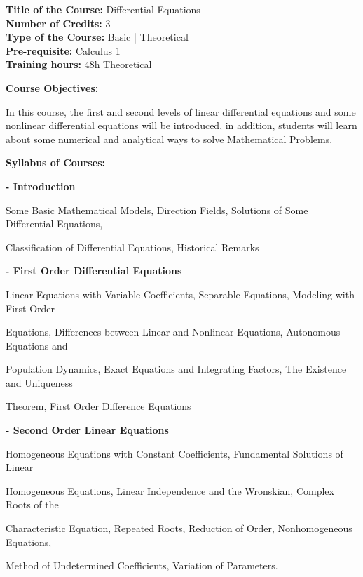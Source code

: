 \documentclass[12pt,a4paper]{article}
\begin{document}
\newpage
\textbf{Title of the Course:} Differential Equations\\
\textbf{Number of Credits:} 3\\
\textbf{Type of the Course:} Basic | Theoretical\\
\textbf{Pre-requisite:} Calculus 1\\
\textbf{Training hours:} 48h Theoretical\par\vspace{4pt}
\textbf{Course Objectives:}\par\vspace{2pt}
In this course, the first and second levels of linear differential equations and some nonlinear
differential equations will be introduced, in addition, students will learn about some numerical and
analytical ways to solve Mathematical Problems.\par\vspace{4pt}
\textbf{Syllabus of Courses:}\par\vspace{2pt}
\vspace{2pt}\textbf{- Introduction}\par
Some Basic Mathematical Models, Direction Fields, Solutions of Some Differential Equations,\par
Classification of Differential Equations, Historical Remarks\par
\vspace{2pt}\textbf{- First Order Differential Equations}\par
Linear Equations with Variable Coefficients, Separable Equations, Modeling with First Order\par
Equations, Differences between Linear and Nonlinear Equations, Autonomous Equations and\par
Population Dynamics, Exact Equations and Integrating Factors, The Existence and Uniqueness\par
Theorem, First Order Difference Equations\par
\vspace{2pt}\textbf{- Second Order Linear Equations}\par
Homogeneous Equations with Constant Coefficients, Fundamental Solutions of Linear\par
Homogeneous Equations, Linear Independence and the Wronskian, Complex Roots of the\par
Characteristic Equation, Repeated Roots, Reduction of Order, Nonhomogeneous Equations,\par
Method of Undetermined Coefficients, Variation of Parameters.\par
\end{document}
